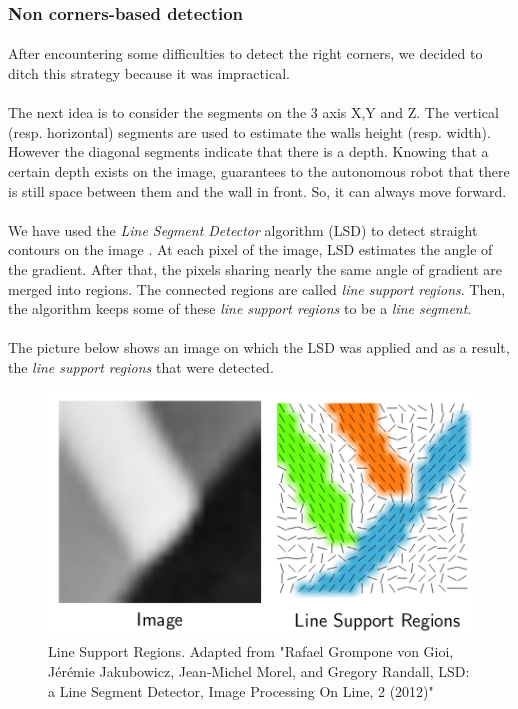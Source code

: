 \documentclass[12pt]{report}
\begin{document}
	 \subsubsection{Non corners-based detection}
	 \paragraph{}
	 After encountering some difficulties to detect the right corners, we decided to ditch this strategy because it was impractical. 
	 
	 \paragraph{}
	 The next idea is to consider the segments on the 3 axis X,Y and Z. The vertical (resp. horizontal) segments are used to estimate the walls height (resp. width). However the diagonal segments indicate that there is a depth. Knowing that a certain depth exists on the image, guarantees to the autonomous robot that there is still space between them and the wall in front. So, it can always move forward.
	  
	  \paragraph{}
	  We have used the \textit{Line Segment Detector} algorithm (LSD) to detect straight contours on the image \cite{grompone_von_gioi_lsd:_2012}. At each pixel of the image, LSD estimates the angle of the gradient. After that, the pixels sharing nearly the same angle of gradient are merged into regions. The connected regions are called \textit{line support regions}. Then, the algorithm keeps some of these \textit{line support regions} to be a \textit{line segment}.
	  
	  \paragraph{}
	  The picture below shows an image on which the LSD was applied and as a result, the \textit{line support regions} that were detected.
	  	\begin{figure}[H]
	  	\begin{center}
	  		\includegraphics[scale=0.6]{res/lsr.png}
	  		\caption{Line Support Regions. Adapted from "Rafael Grompone von Gioi, Jérémie Jakubowicz, Jean-Michel Morel, and Gregory Randall, LSD: a Line Segment Detector, Image Processing On Line, 2 (2012)" }
	  	\end{center}
	  \end{figure}
\end{document}
